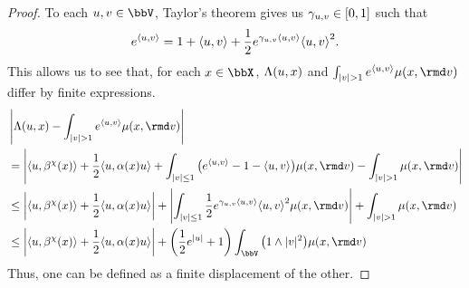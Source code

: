 \begin{proof}
  \label{proof:lemma:odeSpace-rationale}
  To each $\momentVar, \vecVar \in \vecSpace$, Taylor's theorem gives us $\gamma_{u,v} \in [0,1]$ such that
  \begin{equation}
    e^{\langle u , v \rangle} = 1 + {\langle u , v \rangle} + \frac12 e^{\gamma_{u,v} {\langle u , v \rangle}} {\langle u , v \rangle}^2.
  \end{equation}
  This allows us to see that, for each $\stateVar \in \stateSpace$, $\Lambda(u,x)$ and $\int_{|\markVar|>1} e^\prj{\momentVar}{\markVar} \affJump(\stateVar,\rmd\markVar)$ differ by finite expressions.
  \begin{align}
    &\left|\ode(\momentVar, \stateVar) - \int_{|\markVar|>1} e^\prj{\momentVar}{\vecVar} \affJump(\stateVar, \rmd\markVar) \right| \tag*{} \\
    &= \left|\prj{\momentVar}{\affDrift^\trunc(\stateVar)} + \frac12\prj{\momentVar}{\affDiff(\stateVar)\momentVar} + \int_{|\vecVar|\leq 1} \big( e^\prj{\momentVar}{\vecVar} - 1 - \prj{\momentVar}{\vecVar} \big) \affJump(\stateVar,\rmd\markVar) - \int_{|\vecVar|>1} \affJump(\stateVar,\rmd\markVar) \right| \\
    &\leq \left|\prj{\momentVar}{\affDrift^\trunc(\stateVar)} + \frac12\prj{\momentVar}{\affDiff(\stateVar)\momentVar} \right| + \left| \int_{|\markVar|\leq1} \frac12 e^{\gamma_{\momentVar,\markVar}\prj{\momentVar}{\markVar}} \prj{\momentVar}{\markVar}^2 \affJump(\stateVar,\rmd\markVar)\right| + \int_{|\markVar|>1} \affJump(\stateVar,\rmd\markVar) \\
    &\leq \left|\prj{\momentVar}{\affDrift^\trunc(\stateVar)} + \frac12\prj{\momentVar}{\affDiff(\stateVar)\momentVar} \right| + \left( \frac12 e^{|\momentVar|} + 1 \right) \int_\vecSpace \big(1 \wedge |\markVar|^2\big) \affJump(\stateVar, \rmd\markVar)
  \end{align}
  Thus, one can be defined as a finite displacement of the other.
\end{proof}

